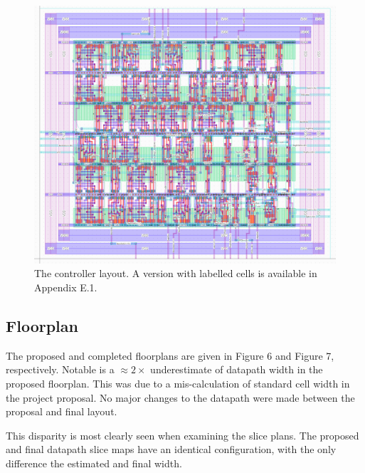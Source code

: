 \documentclass[12pt]{article}
\begin{document}
\begin{figure}[H]
    \begin{center}
    \includegraphics[width=12cm]{HMMMControllerFull.png}
    \end{center}
    \caption{The controller layout. A version with labelled cells is available in Appendix E.1.}
    \label{fig:controllerlayout}
\end{figure}

\subsection{Floorplan}

The proposed and completed floorplans are given in Figure 6 and Figure 7, respectively. Notable is a $\approx 2\times$  underestimate of datapath width in the proposed floorplan. This was due to a mis-calculation of standard cell width in the project proposal. No major changes to the datapath were made between the proposal and final layout.

This disparity is most clearly seen when examining the slice plans. The proposed and final datapath slice maps have an identical configuration, with the only difference the estimated and final width.
\end{document}
